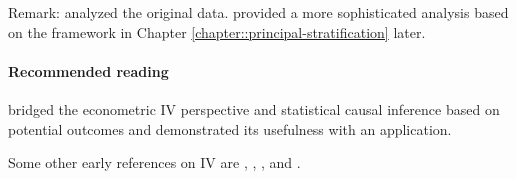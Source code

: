 Remark: 
\citet{schochet2008does} analyzed the original data.
\citet{frumento2012evaluating} provided a more sophisticated analysis based on the framework in Chapter \ref{chapter::principal-stratification} later. 


 \paragraph{Recommended reading}

\citet{angrist1996identification} bridged the econometric IV perspective and statistical causal inference based on potential outcomes and demonstrated its usefulness with an application. 

Some other early references on IV are \citet{permutt1989simultaneous},  \citet{sommer1991estimating}, \citet{baker1994paired}, and \citet{cuzick1997adjusting}. 


